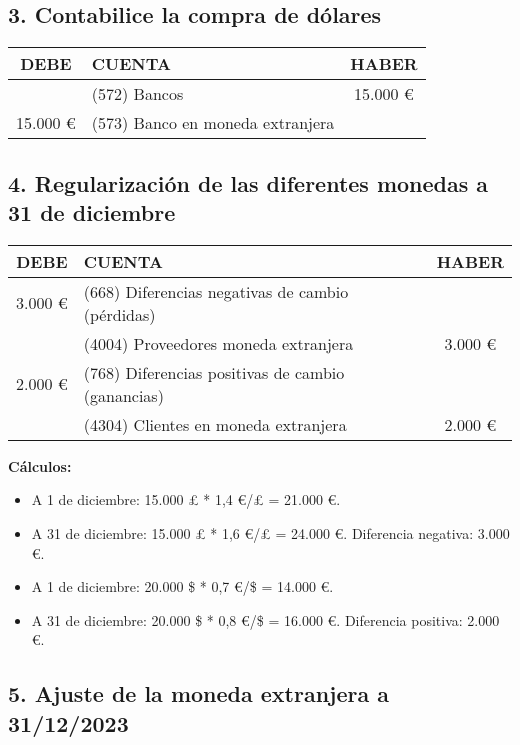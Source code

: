 \subsection*{3. Contabilice la compra de dólares}

\begin{table}[h!]
\centering
\begin{tabular}{|c|l|c|}
\hline
\textbf{DEBE} & \textbf{CUENTA} & \textbf{HABER} \\ \hline
              & (572) Bancos & 15.000 € \\ \hline
15.000 €      & (573) Banco en moneda extranjera & \\ \hline
\end{tabular}
\end{table}

\subsection*{4. Regularización de las diferentes monedas a 31 de diciembre}

\begin{table}[h!]
\centering
\begin{tabular}{|c|l|c|}
\hline
\textbf{DEBE} & \textbf{CUENTA} & \textbf{HABER} \\ \hline
3.000 €       & (668) Diferencias negativas de cambio (pérdidas) & \\ \hline
              & (4004) Proveedores moneda extranjera & 3.000 € \\ \hline
2.000 €       & (768) Diferencias positivas de cambio (ganancias) & \\ \hline
              & (4304) Clientes en moneda extranjera & 2.000 € \\ \hline
\end{tabular}
\end{table}

\textbf{Cálculos:}
\begin{itemize}
    \item A 1 de diciembre: 15.000 £ * 1,4 €/£ = 21.000 €.
    \item A 31 de diciembre: 15.000 £ * 1,6 €/£ = 24.000 €. Diferencia negativa: 3.000 €.
    \item A 1 de diciembre: 20.000 \$ * 0,7 €/\$ = 14.000 €.
    \item A 31 de diciembre: 20.000 \$ * 0,8 €/\$ = 16.000 €. Diferencia positiva: 2.000 €.
\end{itemize}

\subsection*{5. Ajuste de la moneda extranjera a 31/12/2023}

